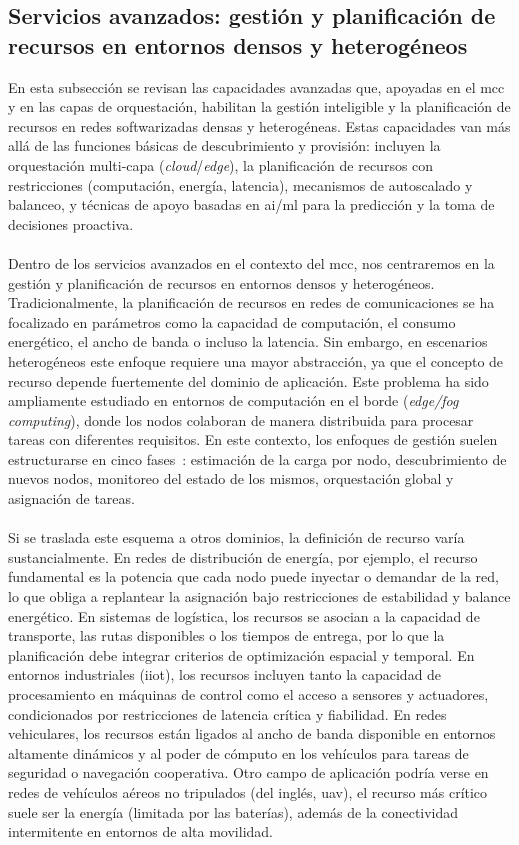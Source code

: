 \subsection{Servicios avanzados: gestión y planificación de recursos en entornos densos y heterogéneos}

En esta subsección se revisan las capacidades avanzadas que, apoyadas en el \gls{mcc} y en las capas de orquestación, habilitan la gestión inteligible y la planificación de recursos en redes softwarizadas densas y heterogéneas. Estas capacidades van más allá de las funciones básicas de descubrimiento y provisión: incluyen la orquestación multi-capa (\textit{cloud}/\textit{edge}), la planificación de recursos con restricciones (computación, energía, latencia), mecanismos de autoscalado y balanceo, y técnicas de apoyo basadas en \gls{ai}/\gls{ml} para la predicción y la toma de decisiones proactiva. \\
\\
Dentro de los servicios avanzados en el contexto del \gls{mcc}, nos centraremos en la gestión y planificación de recursos en entornos densos y heterogéneos. Tradicionalmente, la planificación de recursos en redes de comunicaciones se ha focalizado en parámetros como la capacidad de computación, el consumo energético, el ancho de banda o incluso la latencia. Sin embargo, en escenarios heterogéneos este enfoque requiere una mayor abstracción, ya que el concepto de recurso depende fuertemente del dominio de aplicación. Este problema ha sido ampliamente estudiado en entornos de computación en el borde (\textit{edge/fog computing}), donde los nodos colaboran de manera distribuida para procesar tareas con diferentes requisitos. En este contexto, los enfoques de gestión suelen estructurarse en cinco fases~\cite{Bachiega23}: estimación de la carga por nodo, descubrimiento de nuevos nodos, monitoreo del estado de los mismos, orquestación global y asignación de tareas. \\
\\
Si se traslada este esquema a otros dominios, la definición de recurso varía sustancialmente. En redes de distribución de energía, por ejemplo, el recurso fundamental es la potencia que cada nodo puede inyectar o demandar de la red, lo que obliga a replantear la asignación bajo restricciones de estabilidad y balance energético. En sistemas de logística, los recursos se asocian a la capacidad de transporte, las rutas disponibles o los tiempos de entrega, por lo que la planificación debe integrar criterios de optimización espacial y temporal. En entornos industriales (\gls{iiot}), los recursos incluyen tanto la capacidad de procesamiento en máquinas de control como el acceso a sensores y actuadores, condicionados por restricciones de latencia crítica y fiabilidad. En redes vehiculares, los recursos están ligados al ancho de banda disponible en entornos altamente dinámicos y al poder de cómputo en los vehículos para tareas de seguridad o navegación cooperativa. Otro campo de aplicación podría verse en redes de vehículos aéreos no tripulados (del inglés, \gls{uav}), el recurso más crítico suele ser la energía (limitada por las baterías), además de la conectividad intermitente en entornos de alta movilidad. \\
